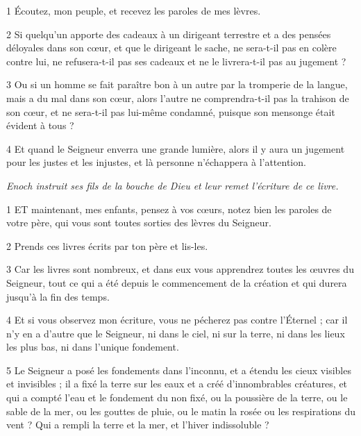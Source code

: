 \par 1 Écoutez, mon peuple, et recevez les paroles de mes lèvres.

\par 2 Si quelqu'un apporte des cadeaux à un dirigeant terrestre et a des pensées déloyales dans son cœur, et que le dirigeant le sache, ne sera-t-il pas en colère contre lui, ne refusera-t-il pas ses cadeaux et ne le livrera-t-il pas au jugement ?

\par 3 Ou si un homme se fait paraître bon à un autre par la tromperie de la langue, mais a du mal dans son cœur, alors l'autre ne comprendra-t-il pas la trahison de son cœur, et ne sera-t-il pas lui-même condamné, puisque son mensonge était évident à tous ?

\par 4 Et quand le Seigneur enverra une grande lumière, alors il y aura un jugement pour les justes et les injustes, et là personne n'échappera à l'attention.


\par \textit{Enoch instruit ses fils de la bouche de Dieu et leur remet l'écriture de ce livre.}

\par 1 ET maintenant, mes enfants, pensez à vos cœurs, notez bien les paroles de votre père, qui vous sont toutes sorties des lèvres du Seigneur.

\par 2 Prends ces livres écrits par ton père et lis-les.

\par 3 Car les livres sont nombreux, et dans eux vous apprendrez toutes les œuvres du Seigneur, tout ce qui a été depuis le commencement de la création et qui durera jusqu'à la fin des temps.

\par 4 Et si vous observez mon écriture, vous ne pécherez pas contre l'Éternel ; car il n'y en a d'autre que le Seigneur, ni dans le ciel, ni sur la terre, ni dans les lieux les plus bas, ni dans l'unique fondement.

\par 5 Le Seigneur a posé les fondements dans l'inconnu, et a étendu les cieux visibles et invisibles ; il a fixé la terre sur les eaux et a créé d'innombrables créatures, et qui a compté l'eau et le fondement du non fixé, ou la poussière de la terre, ou le sable de la mer, ou les gouttes de pluie, ou le matin la rosée ou les respirations du vent ? Qui a rempli la terre et la mer, et l'hiver indissoluble ?

